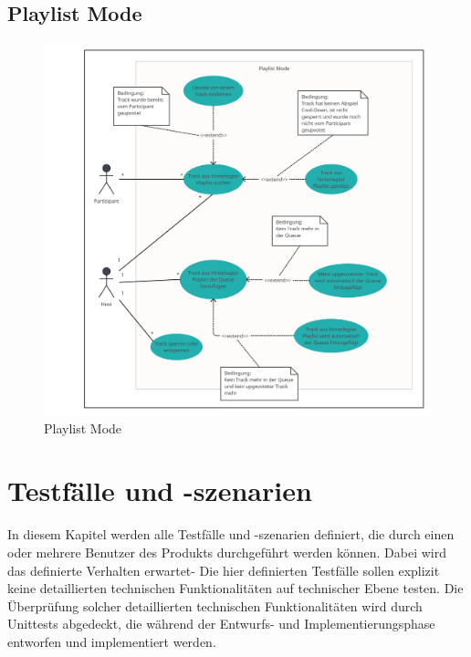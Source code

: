 \documentclass[oneside, ngerman]{sdqtechreport}
\begin{document}
\newpage

\section{Playlist Mode}
\label{sec:Anwendungsfälle:Playlist Mode}
\hypertarget{Playlist Mode}{}

\begin{figure}[h]
    \includegraphics[width = 16cm]{LATEX/Pflichtenheft/GraphicDesigns/Use Case Playlist Mode.png}
    \caption{Playlist Mode}
    \label{fig:Use Case Playlist Mode}
\end{figure}



\chapter{Testfälle und -szenarien}
\label{chap:Tests}

In diesem Kapitel werden alle Testfälle und -szenarien definiert, die durch einen oder mehrere Benutzer des Produkts durchgeführt werden können. Dabei wird das definierte Verhalten erwartet- Die hier definierten Testfälle sollen explizit keine detaillierten technischen Funktionalitäten auf technischer Ebene testen. Die Überprüfung solcher detaillierten technischen Funktionalitäten wird durch Unittests abgedeckt, die während der Entwurfs- und Implementierungsphase entworfen und implementiert werden.
\end{document}
